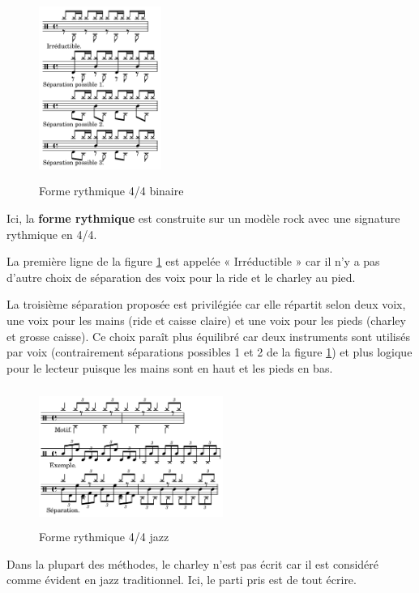 \label{sys_sep_voix}
\begin{figure}[h]
	\centering
	\includegraphics[height=60mm, width=40mm]{
    z_images/3_methodes/2_systemes/1_separation_4-4_binaire.png}
	\caption{Forme rythmique 4/4 binaire}
	\label{binaire}
\end{figure}


Ici, la \textbf{forme rythmique} est construite sur un modèle rock avec une
signature rythmique en 4/4.

La première ligne de la figure \ref{binaire} est
appelée « Irréductible » car il n’y a pas d’autre choix de séparation des voix
pour la ride et le charley au pied.

La troisième séparation proposée est privilégiée car elle répartit selon deux 
voix, une voix pour les mains (ride et caisse claire) et une voix pour les
pieds (charley et grosse caisse). Ce choix paraît plus équilibré car deux
instruments sont utilisés par voix (contrairement séparations possibles 1 et 2
de la figure \ref{binaire}) et plus logique pour le lecteur puisque les mains
sont en haut et les pieds en bas.

\begin{figure}[h]
\centering
\includegraphics[height=45mm, width=60mm]{
z_images/3_methodes/2_systemes/2_separation_4-4_jazz.png}
\caption{Forme rythmique 4/4 jazz}
\label{jazz}
\end{figure}
\newpage
Dans la plupart des méthodes, le charley n’est pas écrit car il est considéré
comme évident en jazz traditionnel. Ici, le parti pris est de tout écrire.


